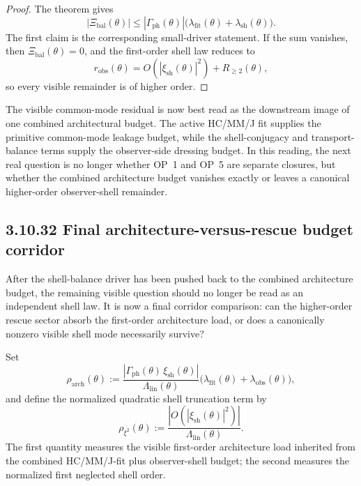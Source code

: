 \begin{proof}
The theorem gives
\[
  |\Xi_{\mathrm{bal}}(\theta)|
  \le
  |\Gamma_{\mathrm{ph}}(\theta)|\bigl(\lambda_{\mathrm{fit}}(\theta)+\lambda_{\mathrm{sh}}(\theta)\bigr).
\]
The first claim is the corresponding small-driver statement. If the sum vanishes, then \(\Xi_{\mathrm{bal}}(\theta)=0\), and the first-order shell law reduces to
\[
  r_{\mathrm{obs}}(\theta)=O\!\left(|\xi_{\mathrm{sh}}(\theta)|^2\right)+R_{\ge 2}(\theta),
\]
so every visible remainder is of higher order.
\end{proof}

\begin{remark}
The visible common-mode residual is now best read as the downstream image of one combined architectural budget. The active HC/MM/J fit supplies the primitive common-mode leakage budget, while the shell-conjugacy and transport-balance terms supply the observer-side dressing budget. In this reading, the next real question is no longer whether OP~1 and OP~5 are separate closures, but whether the combined architecture budget vanishes exactly or leaves a canonical higher-order observer-shell remainder.
\end{remark}


\subsection*{3.10.32 Final architecture-versus-rescue budget corridor}
After the shell-balance driver has been pushed back to the combined architecture budget, the remaining visible question should no longer be read as an independent shell law. It is now a final corridor comparison: can the higher-order rescue sector absorb the first-order architecture load, or does a canonically nonzero visible shell mode necessarily survive?

\begin{definition}
Set
\[
  \rho_{\mathrm{arch}}(\theta)
  :=
  \frac{|\Gamma_{\mathrm{ph}}(\theta)\,\xi_{\mathrm{sh}}(\theta)|}{\Lambda_{\mathrm{lin}}(\theta)}
  \bigl(\lambda_{\mathrm{fit}}(\theta)+\lambda_{\mathrm{obs}}(\theta)\bigr),
\]
and define the normalized quadratic shell truncation term by
\[
  \rho_{\xi^2}(\theta)
  :=
  \frac{|O(|\xi_{\mathrm{sh}}(\theta)|^2)|}{\Lambda_{\mathrm{lin}}(\theta)}.
\]
The first quantity measures the visible first-order architecture load inherited from the combined HC/MM/J-fit plus observer-shell budget; the second measures the normalized first neglected shell order.
\end{definition}

